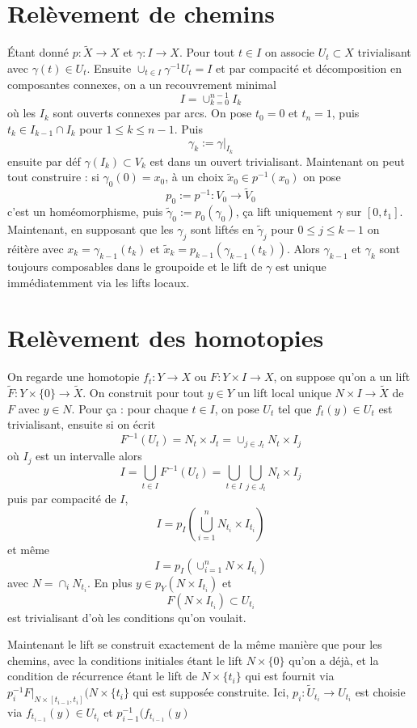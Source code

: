 \documentclass[a4paper,12pt]{article}
\theoremstyle{plain}
\theoremstyle{definition}
\theoremstyle{remark}
\begin{document}
\section{Relèvement de chemins}
Étant donné $p\colon \tilde X\to X$ et $\gamma\colon I\to X$.
Pour tout $t\in I$ on associe $U_t\subset X$ trivialisant
avec $\gamma(t)\in U_t$. Ensuite $\cup_{t\in I}\gamma^{-1}U_t=I$
et par compacité et décomposition en composantes connexes,
on a un recouvrement minimal 
\[I=\cup_{k=0}^{n-1} I_k\]
où les $I_k$ sont ouverts connexes par arcs. On pose 
$t_0=0$ et $t_n=1$, puis $t_k\in I_{k-1}\cap I_{k}$ pour 
$1\leq k\leq n-1$. Puis 
\[\gamma_k:=\gamma|_{I_k}\]
ensuite par déf $\gamma(I_k)\subset V_k$ est dans un 
ouvert
trivialisant. Maintenant on peut tout construire : si 
$\gamma_0(0)=x_0$, à un choix $\tilde x_0\in p^{-1}(x_0)$
on pose
\[p_0:=p^{-1}\colon V_0\to \tilde V_0\]
c'est un homéomorphisme, puis 
$\tilde\gamma_0:=p_0(\gamma_0)$, ça lift uniquement 
$\gamma$ sur $[0,t_1]$. Maintenant, en supposant que
les $\gamma_j$ sont liftés en $\tilde\gamma_j$ pour 
$0\leq j\leq k-1$ on réitère avec 
$x_k=\gamma_{k-1}(t_k)$ et 
$\tilde x_k=p_{k-1}(\gamma_{k-1}(t_k))$.
Alors $\gamma_{k-1}$ et $\gamma_{k}$ sont toujours
composables dans le groupoide et le lift de $\gamma$ est
unique immédiatemment via les lifts locaux.

\section{Relèvement des homotopies}
On regarde une homotopie $f_t\colon Y\to X$ ou
$F\colon Y\times I\to X$, on suppose qu'on a un lift
$\tilde F\colon Y\times \{0\}\to \tilde X$. On construit
pour tout $y\in Y$ un lift local unique 
$N\times I\to \tilde X$ de $F$ avec $y\in N$. Pour ça :
pour chaque $t\in I$, on pose $U_t$ tel que 
$f_t(y)\in U_t$ est trivialisant, ensuite si on écrit
\[F^{-1}(U_t)=N_t\times J_t=\cup_{j\in J_t}N_t\times I_j\]
où $I_j$ est un intervalle alors
\[I=\bigcup_{t\in I} F^{-1}(U_t)=\bigcup_{t\in I}\bigcup_{j\in J_t}N_t\times I_j\]
puis par compacité de $I$, 
\[I=p_I(\bigcup_{i=1}^nN_{t_i}\times I_{t_i})\]
et même 
\[I=p_I(\cup_{i=1}^nN\times I_{t_i})\]
avec $N=\cap_i N_{t_i}$. En plus 
$y\in p_Y(N\times I_{t_i})$ et
\[F(N\times I_{t_i})\subset U_{t_i}\]
est trivialisant d'où les conditions qu'on voulait.


Maintenant le lift se construit exactement de la même
manière que pour les chemins, avec la conditions
initiales étant le lift $N\times \{0\}$ qu'on a déjà,
et la condition de récurrence étant le lift de
$N\times \{t_i\}$ qui est fournit via
$p_i^{-1}F|_{N\times [t_{i-1},t_i]}(N\times \{t_i\}$
qui est supposée construite. Ici, 
$p_i\colon \tilde U_{t_i}\to U_{t_i}$ est choisie via
$f_{t_{i-1}}(y)\in U_{t_i}$ et $p_{i-1}^{-1}(f_{t_{i-1}}(y)$
\end{document}
